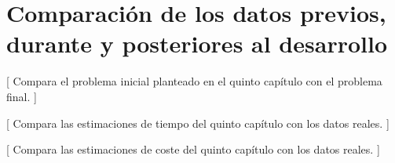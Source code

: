 \chapter{Comparación de los datos previos, durante y posteriores al desarrollo}

[ Compara el problema inicial planteado en el quinto capítulo con el problema final. ]

[ Compara las estimaciones de tiempo del quinto capítulo con los datos reales. ]

[ Compara las estimaciones de coste del quinto capítulo con los datos reales. ]
